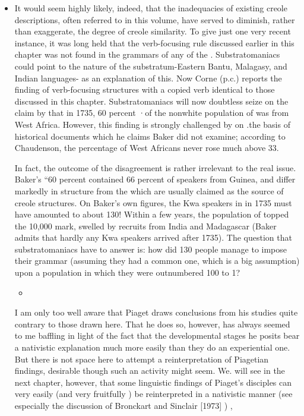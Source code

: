 \begin{itemize}
\begin{itemize}
\begin{itemize}
\begin{itemize}
\begin{itemize}
\begin{itemize}
\begin{itemize}
\item It would seem highly likely, indeed, that the inadequacies of existing creole descriptions, often referred to in this volume, have served to diminish, rather than exaggerate, the degree of creole simi\-larity. To give just one very recent instance, it was long held that the verb-focusing rule discussed earlier in this chapter was not found in the grammars of any of the . Substratomaniacs could point to the nature of the substratum-Eastern Bantu, Malagasy, and Indian languages- as an explanation of this. Now Corne (p.c.) reports the finding of verb-focusing structures with a copied verb identical to those discussed in this chapter. Substratomaniacs will now doubtless seize on the claim by \citet{Baker1976} that in 1735, 60 percent ·of the nonwhite population of  was from West Africa. However, this finding is strongly challenged by \citet{Chaudenson1979} on .the basis of historical documents which he claims Baker did not examine; according to Chaudenson, the percentage of West Africans never rose much above 33.

In fact, the outcome of the disagreement is rather irrelevant to the real issue. Baker's ``60 percent contained 66 percent of speakers from Guinea, and  differ markedly in structure from the  which are usually claimed as the source of creole structures. On Baker's own figures, the Kwa speakers in  in 1735 must have amounted to about 130! Within a few years, the population of  topped the 10,000 mark, swelled by recruits from India and Madagascar (Baker admits that hardly any Kwa speakers arrived after 1735). The question that substratomaniacs have to answer is: how did 130 people manage to impose their grammar (assuming they had a common one, which is a big assumption) upon a population in which they were outnumbered 100 to 1?

\begin{itemize}
\item 
\end{itemize}

I am only too well aware that Piaget draws conclusions from his studies quite contrary to those drawn here. That he does so, how\-ever, has always seemed to me baffling in light of the fact that the developmental stages he posits bear a nativistic explanation much more easily than they do an experiential one. But there is not space here to attempt a reinterpretation of Piagetian findings, desirable though such an activity might seem. We. will see in the next chapter, however, that some linguistic findings of Piaget's disciples can very easily (and very fruitfully ) be reinterpreted in a nativistic manner (see especially the discussion of Bronckart and Sinclair [1973] ) ,


\end{itemize}
\end{itemize}
\end{itemize}
\end{itemize}
\end{itemize}
\end{itemize}
\end{itemize}
